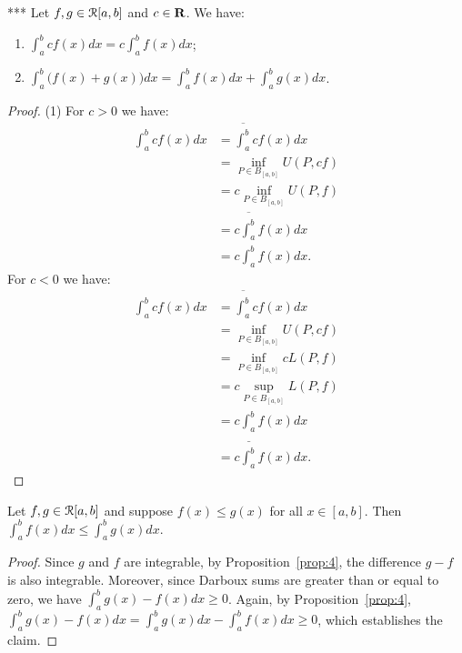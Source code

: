 \documentclass[10pt,twoside,openany]{memoir}
\begin{document}
    \begin{corollary}***
        Let $f,g \in \mathcal{R}[a,b]$ and $c \in \mathbf{R}$. We have:
            \begin{enumerate}[label = (\arabic*),itemsep=1pt,topsep=3pt]
                \item $\int_a^b cf(x)dx  = c \int_a^b f(x)dx$;
                \item $\int_a^b \bigl(f(x) + g(x)\bigr)dx = \int_a^b f(x)dx + \int_a^b g(x)dx$.
            \end{enumerate}
    \end{corollary}
        \begin{proof}
            (1) For $c > 0$ we have:
                    \begin{equation*}
                    \begin{split}
                        \int_a^bcf(x)dx
                        & = \overline{\int_a^b}cf(x)dx \\
                        & = \inf_{P \in B_{[a,b]}}U(P,cf) \\
                        & = c\inf_{P \in B_{[a,b]}}U(P,f) \\
                        & = c\overline{\int_a^b}f(x)dx \\
                        & = c\int_a^bf(x)dx.
                    \end{split}
                    \end{equation*}
                For $c < 0$ we have:
                    \begin{equation*}
                    \begin{split}
                        \int_a^bcf(x)dx
                        & = \overline{\int_a^b}cf(x)dx \\
                        & = \inf_{P \in B_{[a,b]}}U(P,cf) \\
                        & = \inf_{P \in B_{[a,b]}}cL(P,f) \\
                        & = c\sup_{P \in B_{[a,b]}}L(P,f) \\
                        & = c\underline{\int_a^b}f(x)dx \\
                        & = c\int_a^bf(x)dx.
                    \end{split}
                    \end{equation*}
        \end{proof}

    
    \begin{corollary}\label{cor:6}
        Let $f,g \in \mathcal{R}[a,b]$ and suppose $f(x) \leq g(x)$ for all $x \in [a,b]$. Then $\int_a^b f(x)dx \leq \int_a^b g(x)dx$.
    \end{corollary}
        \begin{proof}
            Since $g$ and $f$ are integrable, by Proposition~\ref{prop:4}, the difference $g - f$ is also integrable. Moreover, since Darboux sums are greater than or equal to zero, we have $\int_a^b g(x) - f(x)dx \geq 0$. Again, by Proposition~\ref{prop:4}, $\int_a^b g(x) - f(x) dx = \int_a^b g(x)dx - \int_a^b f(x)dx \geq 0$, which establishes the claim. 
        \end{proof}
\end{document}
